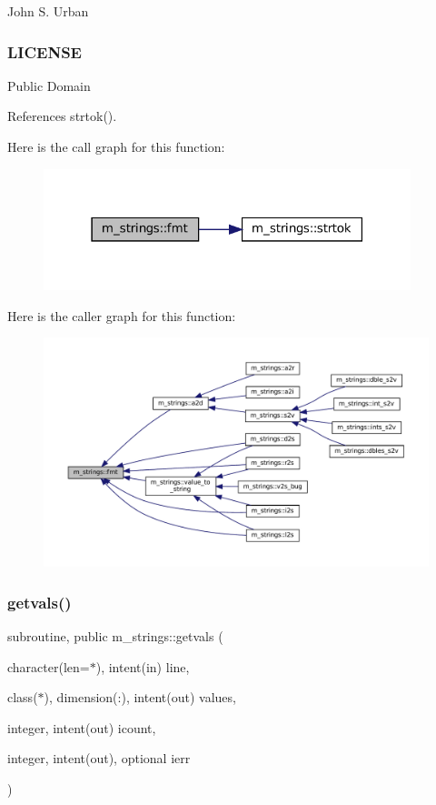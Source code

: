 John S. Urban \subsubsection*{L\+I\+C\+E\+N\+SE}

Public Domain 

References strtok().

Here is the call graph for this function\+:\nopagebreak
\begin{figure}[H]
\begin{center}
\leavevmode
\includegraphics[width=303pt]{namespacem__strings_afccf1e453a4315a639f133f2f7c0078b_cgraph}
\end{center}
\end{figure}
Here is the caller graph for this function\+:\nopagebreak
\begin{figure}[H]
\begin{center}
\leavevmode
\includegraphics[width=350pt]{namespacem__strings_afccf1e453a4315a639f133f2f7c0078b_icgraph}
\end{center}
\end{figure}
\mbox{\label{namespacem__strings_abf6c760f5d15a306bd252337d0a5ba4d}} 
\subsubsection{\texorpdfstring{getvals()}{getvals()}}
{\footnotesize\ttfamily subroutine, public m\+\_\+strings\+::getvals (\begin{DoxyParamCaption}\item[{character(len=$\ast$), intent(in)}]{line,  }\item[{class($\ast$), dimension(\+:), intent(out)}]{values,  }\item[{integer, intent(out)}]{icount,  }\item[{integer, intent(out), optional}]{ierr }\end{DoxyParamCaption})}



